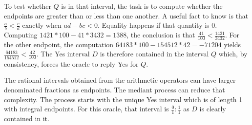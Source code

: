\documentclass[12pt]{article}
\theoremstyle{remark}
\begin{document}
To test whether $Q$ is in that interval, the task is to compute whether the endpoints are greater than or less than one another. A useful fact to know is that $\frac{a}{b} < \frac{c}{d}$ exactly when $ad - bc < 0$. Equality happens if that quantity is 0. Computing $1421*100 - 41*3432 = 1388$, the conclusion is that $\frac{41}{100} < \frac{1421}{3432}$. For the other endpoint, the computation $64183*100 - 154512*42 = -71204$ yields $ \frac{64183}{154512} < \frac{42}{100}$. The Yes interval $D$ is therefore contained in the interval $Q$ which, by consistency, forces the oracle to reply Yes for $Q$. 

The rational intervals obtained from the arithmetic operators can have larger denominated fractions as endpoints. The mediant process can reduce that complexity. The process starts with the unique Yes interval which is of length 1 with integral endpoints. For this oracle, that interval is $\frac{0}{1}:\frac{1}{1}$ as $D$ is clearly contained in it. 
\end{document}
